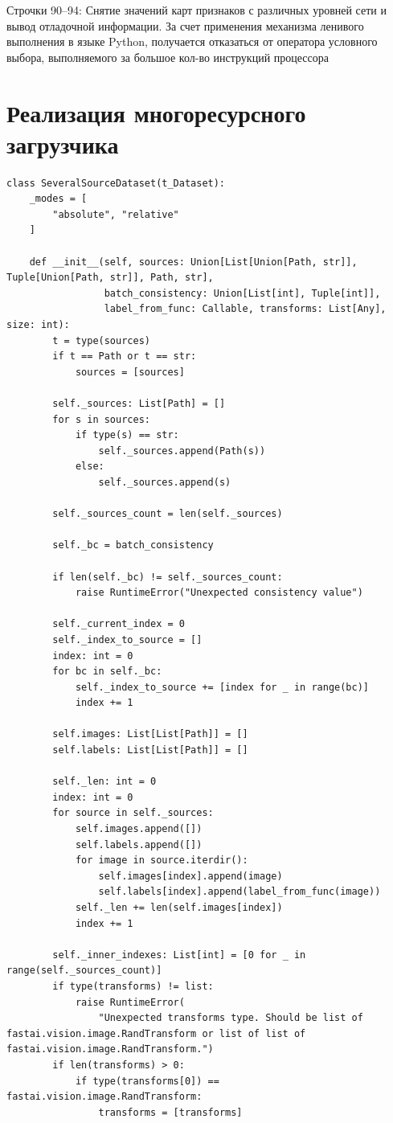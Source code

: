 Строчки 90--94: Снятие значений карт признаков с различных уровней сети и вывод отладочной информации.
За счет применения механизма ленивого выполнения в языке Python,
получается отказаться от оператора условного выбора, выполняемого за большое кол-во инструкций процессора

\section{Реализация многоресурсного загрузчика}

\begin{lstlisting}[python]
    class SeveralSourceDataset(t_Dataset):
    _modes = [
        "absolute", "relative"
    ]

    def __init__(self, sources: Union[List[Union[Path, str]], Tuple[Union[Path, str]], Path, str],
                 batch_consistency: Union[List[int], Tuple[int]],
                 label_from_func: Callable, transforms: List[Any], size: int):
        t = type(sources)
        if t == Path or t == str:
            sources = [sources]

        self._sources: List[Path] = []
        for s in sources:
            if type(s) == str:
                self._sources.append(Path(s))
            else:
                self._sources.append(s)

        self._sources_count = len(self._sources)

        self._bc = batch_consistency

        if len(self._bc) != self._sources_count:
            raise RuntimeError("Unexpected consistency value")

        self._current_index = 0
        self._index_to_source = []
        index: int = 0
        for bc in self._bc:
            self._index_to_source += [index for _ in range(bc)]
            index += 1

        self.images: List[List[Path]] = []
        self.labels: List[List[Path]] = []

        self._len: int = 0
        index: int = 0
        for source in self._sources:
            self.images.append([])
            self.labels.append([])
            for image in source.iterdir():
                self.images[index].append(image)
                self.labels[index].append(label_from_func(image))
            self._len += len(self.images[index])
            index += 1

        self._inner_indexes: List[int] = [0 for _ in range(self._sources_count)]
        if type(transforms) != list:
            raise RuntimeError(
                "Unexpected transforms type. Should be list of fastai.vision.image.RandTransform or list of list of fastai.vision.image.RandTransform.")
        if len(transforms) > 0:
            if type(transforms[0]) == fastai.vision.image.RandTransform:
                transforms = [transforms]


\end{lstlisting}
